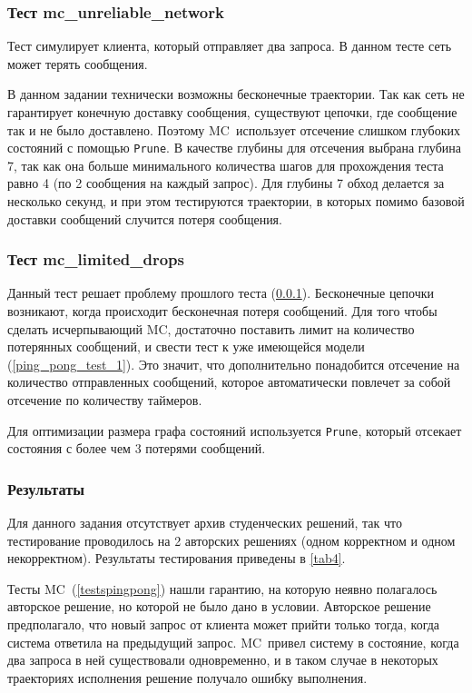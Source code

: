 \documentclass[a4paper,12pt]{extarticle}
\newcommand{\prune}[0]{\texttt{Prune}}
\newcommand{\mc}[0]{MC}
\begin{document}
\subsubsection{Тест mc\_unreliable\_network}
\label{ping_pong_test_2}

Тест симулирует клиента, который отправляет два запроса.
В данном тесте сеть может терять сообщения.

В данном задании технически возможны бесконечные траектории.
Так как сеть не гарантирует конечную доставку сообщения, существуют цепочки, где сообщение так и не было доставлено.
Поэтому \mc\ использует отсечение слишком глубоких состояний с помощью \prune.
В качестве глубины для отсечения выбрана глубина 7, так как она больше минимального количества шагов для прохождения теста равно 4 (по 2 сообщения на каждый запрос).
Для глубины 7 обход делается за несколько секунд, и при этом тестируются траектории, в которых помимо базовой доставки сообщений случится потеря сообщения.

\subsubsection{Тест mc\_limited\_drops}
\label{ping_pong_test_3}

Данный тест решает проблему прошлого теста (\cref{ping_pong_test_2}).
Бесконечные цепочки возникают, когда происходит бесконечная потеря сообщений.
Для того чтобы сделать исчерпывающий \mc, достаточно поставить лимит на количество потерянных сообщений, и свести тест к уже имеющейся модели (\cref{ping_pong_test_1}).
Это значит, что дополнительно понадобится отсечение на количество отправленных сообщений, которое автоматически повлечет за собой отсечение по количеству таймеров.

Для оптимизации размера графа состояний используется \prune, который отсекает состояния с более чем 3 потерями сообщений.

\subsubsection{Результаты}

Для данного задания отсутствует архив студенческих решений, так что тестирование проводилось на 2 авторских решениях (одном корректном и одном некорректном).
Результаты тестирования приведены в \cref{tab4}.

Тесты \mc\ (\cref{testspingpong}) нашли гарантию, на которую неявно полагалось авторское решение, но которой не было дано в условии.
Авторское решение предполагало, что новый запрос от клиента может прийти только тогда, когда система ответила на предыдущий запрос.
\mc\ привел систему в состояние, когда два запроса в ней существовали одновременно, и в таком случае в некоторых траекториях исполнения решение получало ошибку выполнения.
\end{document}

